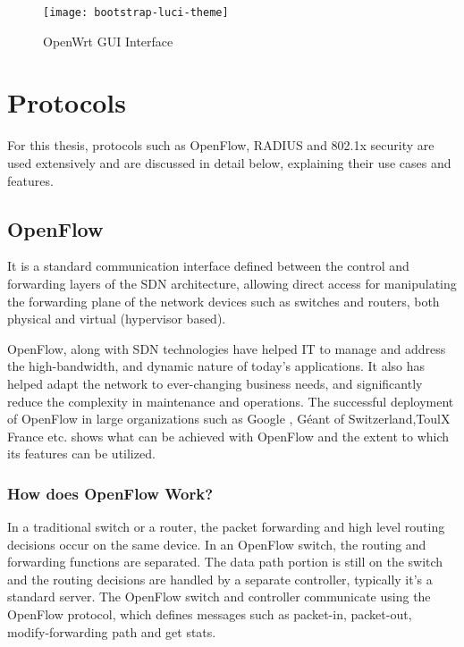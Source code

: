 \begin{figure}
	\centering
	\texttt{[image: bootstrap-luci-theme]}
	\caption{OpenWrt GUI Interface \cite{openwrt_luci_img}} \label{fig:OpenWrt_gui}
	\vspace{-10pt}
\end{figure}
\section{Protocols} \label{protocols}
For this thesis, protocols such as OpenFlow, RADIUS and 802.1x security are used extensively and are discussed in detail below, explaining their use cases and features.
\subsection{OpenFlow \cite{WhatIsOpenFlow}} \label{OpenFlow}

It is a standard communication interface defined between the control and forwarding layers of the SDN architecture, allowing direct access for manipulating the forwarding plane of the network devices such as switches and routers, both physical and virtual (hypervisor based).

OpenFlow, along with SDN technologies have helped IT to manage and address the high-bandwidth, and dynamic nature of today’s applications. It also has helped adapt the network to ever-changing business needs, and significantly reduce the complexity in maintenance and operations. The successful deployment \cite{of_depl} of OpenFlow in large organizations such as Google \cite{of_google}, Géant of Switzerland,ToulX France etc. shows what can be achieved with OpenFlow and the extent to which its features can be utilized.

%

\subsubsection{How does OpenFlow Work? \cite{OpenFlow_functionality}} \label{OpenFlow_Functionality}
In a traditional switch or a router, the packet forwarding and high level routing decisions occur on the same device. In an OpenFlow switch, the routing and forwarding functions are separated. The data path portion is still on the switch and the routing decisions are handled by a separate controller, typically it’s a standard server. The OpenFlow switch and controller communicate using the OpenFlow protocol, which defines messages such as packet-in, packet-out, modify-forwarding path and get stats.
